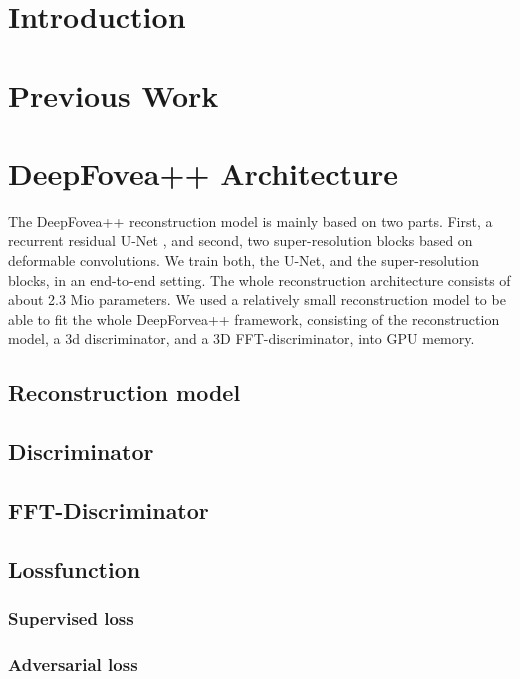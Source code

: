 \documentclass[10pt,twocolumn,letterpaper]{article}
\begin{document}
\section{Introduction} %

\section{Previous Work} %

\section{DeepFovea++ Architecture} %
The DeepFovea++ reconstruction model is mainly based on two parts. First, a recurrent residual U-Net \cite{unet, deepfovea}, and second, two super-resolution blocks based on deformable convolutions. We train both, the U-Net, and the super-resolution blocks, in an end-to-end setting. The whole reconstruction architecture consists of about 2.3 Mio parameters. We used a relatively small reconstruction model to be able to fit the whole DeepForvea++ framework, consisting of the reconstruction model, a 3d discriminator, and a 3D FFT-discriminator, into GPU memory.

\subsection{Reconstruction model}

\subsection{Discriminator}

\subsection{FFT-Discriminator}

\subsection{Lossfunction}

\subsubsection{Supervised loss}

\subsubsection{Adversarial loss}
\end{document}
